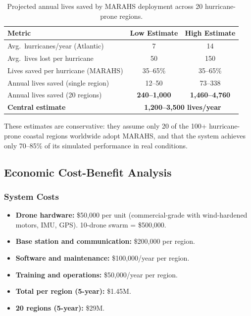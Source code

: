 \documentclass[12pt,a4paper,twocolumn]{article}
\begin{document}
\begin{enumerate}[leftmargin=*]
\begin{table}[t]
\centering
\caption{Projected annual lives saved by MARAHS deployment across 20 hurricane-prone regions.}
\label{tab:lives}
\small
\begin{tabular}{lcc}
\toprule
\textbf{Metric} & \textbf{Low Estimate} & \textbf{High Estimate} \\
\midrule
Avg.\ hurricanes/year (Atlantic) & 7 & 14 \\
Avg.\ lives lost per hurricane & 50 & 150 \\
Lives saved per hurricane (MARAHS) & 35--65\% & 35--65\% \\
Annual lives saved (single region) & 12--50 & 73--338 \\
Annual lives saved (20 regions) & \textbf{240--1,000} & \textbf{1,460--4,760} \\
\midrule
\textbf{Central estimate} & \multicolumn{2}{c}{\textbf{1,200--3,500 lives/year}} \\
\bottomrule
\end{tabular}
\end{table}

These estimates are conservative: they assume only 20 of the 100+ hurricane-prone coastal regions worldwide adopt MARAHS, and that the system achieves only 70--85\% of its simulated performance in real conditions.

\subsection{Economic Cost-Benefit Analysis}
\label{sec:cost_benefit}

\subsubsection{System Costs}
\begin{itemize}[leftmargin=*]
    \item \textbf{Drone hardware:} \$50,000 per unit (commercial-grade with wind-hardened motors, IMU, GPS). 10-drone swarm = \$500,000.
    \item \textbf{Base station and communication:} \$200,000 per region.
    \item \textbf{Software and maintenance:} \$100,000/year per region.
    \item \textbf{Training and operations:} \$50,000/year per region.
    \item \textbf{Total per region (5-year):} \$1.45M.
    \item \textbf{20 regions (5-year):} \$29M.
\end{itemize}


\end{enumerate}
\end{document}

